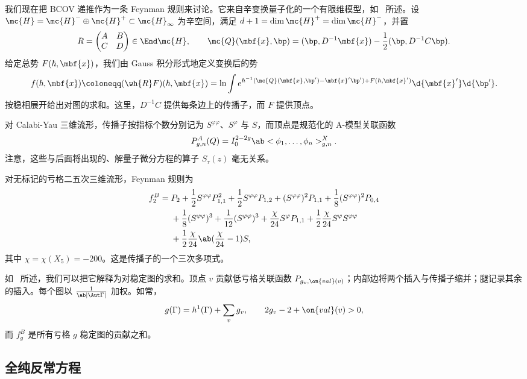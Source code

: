 我们现在把 BCOV 递推作为一条 Feynman 规则来讨论。它来自辛变换量子化的一个有限维模型，如~ 所述。设 \(\mc{H} = \mc{H}^- \oplus \mc{H}^+ \subset \mc{H}_{\infty}\) 为辛空间，满足 \(d+1 = \dim \mc{H}^+ = \dim \mc{H}^-\)，并置
\[ R = \begin{pmatrix} A & B \\ C & D \end{pmatrix} \in \End \mc{H}, \qquad \mc{Q}(\mbf{x},\bp) = (\bp, D^{-1}\mbf{x}) - \frac{1}{2}(\bp, D^{-1}C\bp). \]
给定总势 \(F(\hbar, \mbf{x})\)，我们由 Gauss 积分形式地定义变换后的势
\[ f(\hbar, \mbf{x}) \coloneqq (\wh{R}F)(\hbar,\mbf{x}) = \ln \int e^{\hbar^{-1}(\mc{Q}(\mbf{x},\bp') - \mbf{x}'\bp') + F(\hbar,\mbf{x}')}\d{\mbf{x}'}\d{\bp'}. \]
按稳相展开给出对图的求和。这里，\(D^{-1}C\) 提供每条边上的传播子，而 \(F\) 提供顶点。

对 Calabi-Yau 三维流形，传播子按指标个数分别记为 \(S^{\varphi\varphi}\)、\(S^{\varphi}\) 与 \(S\)，而顶点是规范化的 A-模型关联函数
\[ P^A_{g,n}(Q) = I_0^{2-2g}\ab<\phi_1, \ldots, \phi_n>^X_{g,n}. \]
注意，这些与后面将出现的、解量子微分方程的算子 \(S_{\tau}(z)\) 毫无关系。

\begin{exm}
    对无标记的亏格二五次三维流形，Feynman 规则为
    \begin{align*}
        f_2^B ={}& P_2 + \frac{1}{2}S^{\varphi\varphi}P_{1,1}^2 + \frac{1}{2}S^{\varphi\varphi}P_{1,2} + (S^{\varphi\varphi})^2 P_{1,1} + \frac{1}{8}(S^{\varphi\varphi})^2 P_{0,4} \\
        &+ \frac{1}{8}(S^{\varphi\varphi})^3 + \frac{1}{12}(S^{\varphi\varphi})^3 + \frac{\chi}{24}S^{\varphi}P_{1,1} + \frac{1}{2}\frac{\chi}{24}S^{\varphi}S^{\varphi\varphi} \\
        &+ \frac{1}{2}\frac{\chi}{24}\ab(\frac{\chi}{24}-1)S,
    \end{align*}
    其中 \(\chi = \chi(X_5) = -200\)。这是传播子的一个三次多项式。
\end{exm}

如~ 所述，我们可以把它解释为对稳定图的求和。顶点 \(v\) 贡献低亏格关联函数 \(P_{g_v, \on{val}(v)}\)；内部边将两个插入与传播子缩并；腿记录其余的插入。每个图以 \(\frac{1}{\ab|\Aut \Gamma|}\) 加权。如常，
\[ g(\Gamma) = h^1(\Gamma) + \sum_v g_v, \qquad 2g_v - 2 + \on{val}(v) > 0, \]
而 \(f_g^B\) 是所有亏格 \(g\) 稳定图的贡献之和。

\subsection{全纯反常方程}%
\label{sub:The holomorphic anomaly equation}

